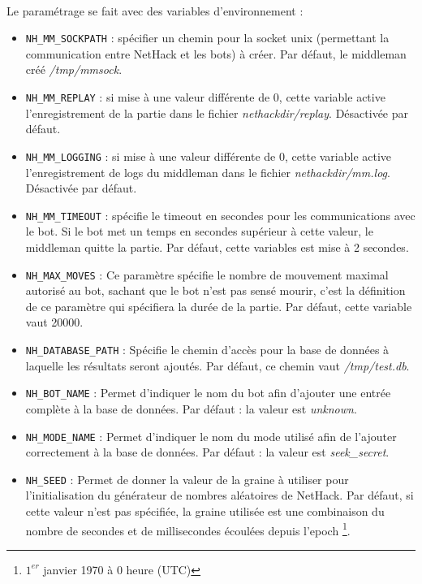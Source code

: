 \documentclass[a4paper,12pt]{article}
\begin{document}
\paragraph{}Le paramétrage se fait avec des variables d'environnement :
\begin{itemize}
\item \verb!NH_MM_SOCKPATH! : spécifier un chemin pour la socket unix (permettant la communication entre NetHack et les bots) à créer. Par défaut, le middleman créé \emph{/tmp/mmsock}.
\item \verb!NH_MM_REPLAY! : si mise à une valeur différente de 0, cette variable active l'enregistrement de la partie dans le fichier \emph{nethackdir/replay}. Désactivée par défaut.
\item \verb!NH_MM_LOGGING! : si mise à une valeur différente de 0, cette variable active l'enregistrement de logs du middleman dans le fichier \emph{nethackdir/mm.log}. Désactivée par défaut.
\item \verb!NH_MM_TIMEOUT! : spécifie le timeout en secondes pour les communications avec le bot. Si le bot met un temps en secondes supérieur à cette valeur, le middleman quitte la partie. Par défaut, cette variables est mise à 2 secondes.
\item \verb!NH_MAX_MOVES! :
  Ce paramètre spécifie le nombre de mouvement maximal autorisé au bot, sachant
  que le bot n'est pas sensé mourir, c'est la définition de ce paramètre qui
  spécifiera la durée de la partie. Par défaut, cette variable vaut 20000.
\item \verb!NH_DATABASE_PATH! :
  Spécifie le chemin d'accès pour la base de données à laquelle les résultats
  seront ajoutés. Par défaut, ce chemin vaut \emph{/tmp/test.db}.
\item \verb!NH_BOT_NAME! :
  Permet d'indiquer le nom du bot afin d'ajouter une entrée complète à la base
  de données. Par défaut : la valeur est \emph{unknown}.
\item \verb!NH_MODE_NAME! :
  Permet d'indiquer le nom du mode utilisé afin de l'ajouter correctement à la
  base de données. Par défaut : la valeur est \emph{seek\_secret}.
\item \verb!NH_SEED! :
  Permet de donner la valeur de la graine à utiliser pour l'initialisation du
  générateur de nombres aléatoires de NetHack. Par défaut, si cette
  valeur n'est pas spécifiée, la graine utilisée est une combinaison du nombre
  de secondes et de millisecondes écoulées depuis l'epoch \footnote{$1^{er}$ janvier
  1970 à 0 heure (UTC)}.

\end{itemize}
\end{document}
